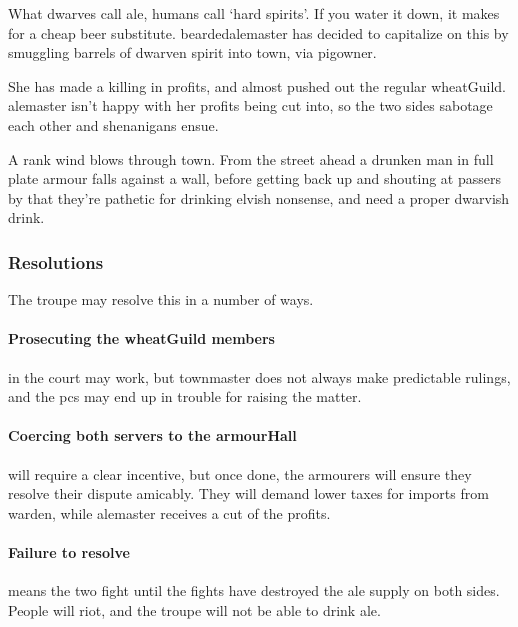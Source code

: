 
\label{troubleAle}

\noindent
What dwarves call ale, humans call `hard spirits'.
If you water it down, it makes for a cheap beer substitute.
\Gls{beardedalemaster} has decided to capitalize on this by smuggling barrels of dwarven spirit into \gls{town}, via \gls{pigowner}.

She has made a killing in profits, and almost pushed out the regular \gls{wheatGuild}.
\Gls{alemaster} isn't happy with her profits being cut into, so the two sides sabotage each other and shenanigans ensue.

\begin{boxtext}

  A rank wind blows through \gls{town}.
  From the street ahead a drunken man in full plate armour falls against a wall, before getting back up and shouting at passers by that they're pathetic for drinking elvish nonsense, and need a proper dwarvish drink.

\end{boxtext}

\subsubsection*{Resolutions}

The troupe may resolve this in a number of ways.

\paragraph{Prosecuting the \gls{wheatGuild} members}
in the \gls{court} may work, but \gls{townmaster} does not always make predictable rulings, and the \glspl{pc} may end up in trouble for raising the matter.%

\paragraph{Coercing both \glspl{server} to the \gls{armourHall}}
will require a clear incentive, but once done, the \glspl{armourer} will ensure they resolve their dispute amicably.
They will demand lower taxes for imports from \gls{warden}, while \gls{alemaster} receives a cut of the profits.
\label{aleResolution}

\paragraph{Failure to resolve}
means the two fight until the fights have destroyed the ale supply on both sides.
People will riot, and the troupe will not be able to drink ale.

